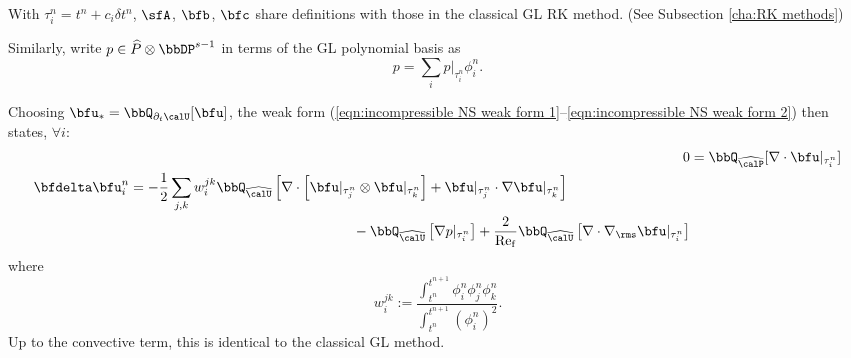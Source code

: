 \begin{example}
        With $\tau^{n}_{i} = t^{n} + c_{i}\delta t^{n}$, $\sfA$, $\bfb$, $\bfc$ share definitions with those in the classical GL RK method. (See Subsection \ref{cha:RK methods})

        Similarly, write $p \in \widehat{P}\otimes\bbDP^{s - 1}$ in terms of the GL polynomial basis as
        \begin{equation}
            p  =  \sum_{i}p|_{\tau^{n}_{i}}\phi^{n}_{i}.
        \end{equation}

        Choosing $\bfu_{*} = \bbQ_{\partial_{t}\calU}[\bfu]$, the weak form (\ref{eqn:incompressible NS weak form 1}--\ref{eqn:incompressible NS weak form 2}) then states, $\forall i$:
        \begin{align}
                                                                                0  &=  \bbQ_{\widehat{\calP}}[\nabla\cdot\bfu|_{\tau^{n}_{i}}]  \\
            \begin{split}
                \bfdelta\bfu^{n}_{i}  &=  - \frac{1}{2}\sum_{j, k}w_{i}^{jk}\bbQ_{\widehat{\calU}}\left[\nabla\cdot\left[\bfu|_{\tau^{n}_{j}}\otimes\bfu|_{\tau^{n}_{k}}\right] + \bfu|_{\tau^{n}_{j}}\cdot\nabla\bfu|_{\tau^{n}_{k}}\right]  \\
                                      &\qquad\qquad\qquad\qquad\qquad\qquad\qquad\qquad- \bbQ_{\widehat{\calU}}\left[\nabla p|_{\tau^{n}_{i}}\right] + \frac{2}{\rmRef}\bbQ_{\widehat{\calU}}\left[\nabla\cdot\nabla_{\rms}\bfu|_{\tau^{n}_{i}}\right]
            \end{split}
        \end{align}
        where
        \begin{equation}\label{eqn:w_i^jk definition}
            w_{i}^{jk}  :=  \frac{\int_{t^{n}}^{t^{n + 1}}\phi^{n}_{i}\phi^{n}_{j}\phi^{n}_{k}}{\int_{t^{n}}^{t^{n + 1}}(\phi^{n}_{i})^{2}}.
        \end{equation}
        Up to the convective term, this is identical to the classical GL method.
        

\end{example}
